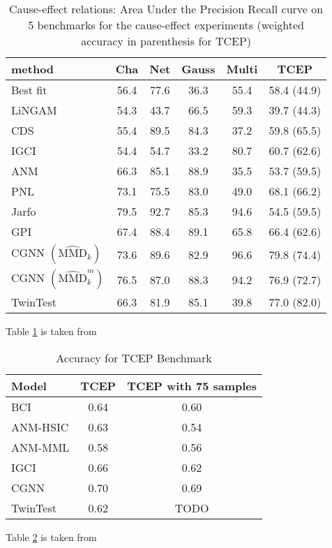 \begin{table}[H]
    \centering


    \begin{tabular}{lccccc}
        \hline method & Cha & Net & Gauss & Multi & TCEP \\
        \hline Best fit & 56.4 & 77.6 & 36.3 & 55.4 & 58.4 (44.9) \\
        LiNGAM & 54.3 & 43.7 & 66.5 & 59.3 & 39.7 (44.3) \\
        CDS & 55.4 & 89.5 & 84.3 & 37.2 & 59.8 (65.5) \\
        IGCI & 54.4 & 54.7 & 33.2 & 80.7 & 60.7 (62.6) \\
        ANM & 66.3 & 85.1 & 88.9 & 35.5 & 53.7 (59.5) \\
        PNL & 73.1 & 75.5 & 83.0 & 49.0 & 68.1 (66.2) \\
        Jarfo & 79.5 & 92.7 & 85.3 & 94.6 & 54.5 (59.5) \\
        GPI & 67.4 & 88.4 & 89.1 & 65.8 & 66.4 (62.6) \\
        CGNN $\left(\widehat{\mathrm{MMD}}_{k}\right)$ & 73.6 & 89.6 & 82.9 & 96.6 & 79.8 (74.4) \\
        CGNN $\left(\widehat{\mathrm{MMD}}_{k}^{m}\right)$ & 76.5 & 87.0 & 88.3 & 94.2 & 76.9 (72.7) \\
        \hline TwinTest & 66.3 & 81.9 & 85.1 & 39.8 & 77.0 (82.0) \\
        \hline
    \end{tabular}

    \caption{Cause-effect relations: Area Under the Precision Recall curve
     on 5 benchmarks for the cause-effect experiments (weighted accuracy 
     in parenthesis for TCEP)}   
    \label{tab:AUPR}
\end{table}

Table \ref{tab:AUPR} is taken from \cite{goudet2017causal}

\begin{table}[H]
    \centering

    \begin{tabular}{lcc}
        \hline Model & TCEP & TCEP with 75 samples \\
        \hline BCI & 0.64 & 0.60 \\
        ANM-HSIC & 0.63 & 0.54 \\
        ANM-MML & 0.58 & 0.56 \\
        IGCI & 0.66 & 0.62 \\
        CGNN & 0.70 & 0.69 \\
        \hline TwinTest & 0.62 & TODO \\
        \hline
    \end{tabular}
    \caption{Accuracy for TCEP Benchmark} 
    \label{tab:acc}
\end{table}

Table \ref{tab:acc} is taken from \cite{kurthen2018bayesian}
